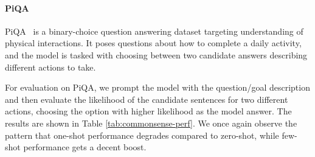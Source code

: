 \documentclass[11pt]{article}
\newcommand{\ours}{MT-NLG}
\begin{document}


\paragraph{PiQA} PiQA~\citep{Bisk2020PIQARA} is a binary-choice question answering dataset targeting understanding of physical interactions. It poses questions about how to complete a daily activity, and the model is tasked with choosing between two candidate answers describing different actions to take.

For evaluation on PiQA, we prompt the model with the question/goal description and then evaluate the likelihood of the candidate sentences for two different actions, choosing the option with higher likelihood as the model answer. The results are shown in Table \ref{tab:commonsense-perf}. We once again observe the pattern that one-shot performance degrades compared to zero-shot, while few-shot performance gets a decent boost. 

\end{document}
